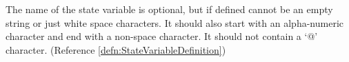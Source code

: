 The name of the state variable is optional, but if defined cannot be an empty string or just white space characters. It should also start with an alpha-numeric character and end with a non-space character. It should not contain a ‘@’ character.
(Reference \ref{defn:StateVariableDefinition})